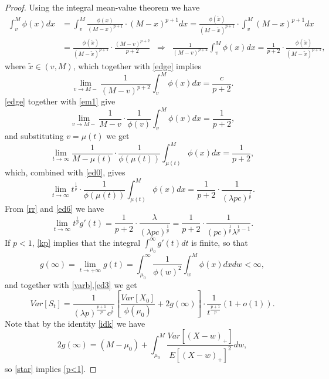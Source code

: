 \documentclass{article}
\numberwithin{equation}{section}
\begin{document}
\begin{proof}
Using the integral mean-value theorem we have
\begin{align*}\int_v^M \phi(x)dx&= \int_v^M \frac{\phi(x)}{(M-x)^{p+1}}\cdot (M-x)^{p+1} dx= \frac{\phi(\tilde{x})}{(M-\tilde{x})^{p+1}}\cdot\int_v^M  (M-x)^{p+1} dx\\
&=\frac{\phi(\tilde{x})}{(M-\tilde{x})^{p+1}}\cdot \frac{(M-v)^{p+2}}{p+2}\;\;
\Rightarrow\;\; \frac{1}{(M-v)^{p+2}}\int_v^M \phi(x)dx =\frac{1}{p+2}\cdot\frac{\phi(\tilde{x})}{(M-\tilde{x})^{p+1}},
\end{align*}
where $\tilde{x}\in (v,M)$, which together with \eqref{edge} implies 
\begin{equation}\label{em1}\lim_{v\rightarrow M-}\frac{1}{(M-v)^{p+2}}\int_v^M \phi(x)dx =\frac{c}{p+2}.\end{equation}
\eqref{edge} together with \eqref{em1} give
\begin{equation*}\lim_{v\rightarrow M-}\frac{1}{M-v}\cdot\frac{1}{\phi(v)}\int_{v}^M \phi(x)dx=\frac{1}{p+2},\end{equation*}
and substituting $v=\mu(t)$ we get
$$\lim_{t\rightarrow\infty}\frac{1}{M-\mu(t)}\cdot \frac{1}{\phi(\mu(t))}\int_{\mu(t)}^M \phi(x)dx=\frac{1}{p+2},$$
which, combined with \eqref{ed0}, gives
\begin{equation}\label{ed6}\lim_{t\rightarrow\infty}t^{\frac{1}{p}}\cdot \frac{1}{\phi(\mu(t))}\int_{\mu(t)}^M \phi(x)dx=\frac{1}{p+2}\cdot \frac{1}{(\lambda p c)^{\frac{1}{p}}}.\end{equation}
From \eqref{rr} and \eqref{ed6} we have
\begin{equation}\label{kp}\lim_{t\rightarrow\infty}t^{\frac{1}{p}}g'(t)=\frac{1}{p+2}\cdot \frac{\lambda}{(\lambda p c)^{\frac{1}{p}}}=\frac{1}{p+2}\cdot \frac{1}{(p c)^{\frac{1}{p}}\lambda^{\frac{1}{p}-1}}.\end{equation}
If $p<1$, \eqref{kp} implies that the integral $\int_{\mu_0}^\infty g'(t)dt$ is finite, so that
$$g(\infty)=\lim_{t\rightarrow +\infty} g(t)=\int_{\mu_0}^{\infty}\frac{1}{\phi(w)^2} \int_{w}^M \phi(x) dx dw<\infty,$$
and together with \eqref{varb},\eqref{ed3} we 
get
\begin{equation}\label{star}Var[S_t]=\frac{1}{(\lambda p)^{\frac{p+1}{p} }c^{\frac{1}{p}}}\left[\frac{Var[X_0]}{\phi(\mu_0)}+2g(\infty) \right]\cdot \frac{1}{t^{\frac{p+1}{p}}}(1+o(1)).
\end{equation}
Note that by the identity
\eqref{idk} we have
$$2g(\infty)=(M-\mu_0)+\int_{\mu_0}^{M}\frac{Var[(X-w)_+]}{E[(X-w)_+]^2}  dw,$$
so \eqref{star} implies \eqref{p<1}.


\end{proof}
\end{document}
